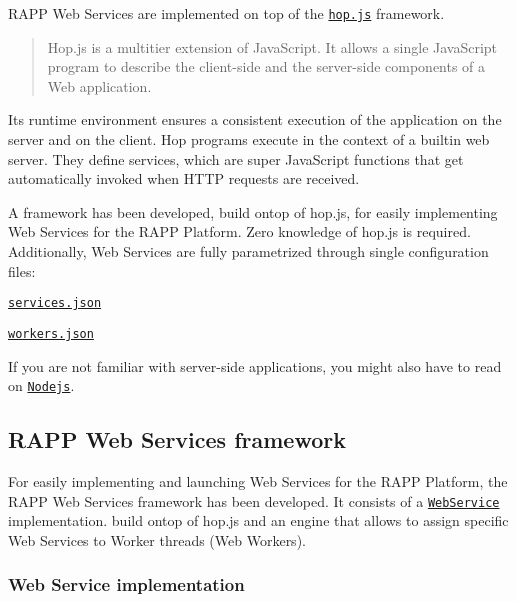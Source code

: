 R\-A\-P\-P Web Services are implemented on top of the \href{http://hop.inria.fr/home/index.html}{\tt hop.\-js} framework. \begin{quotation}
Hop.\-js is a multitier extension of Java\-Script. It allows a single Java\-Script program to describe the client-\/side and the server-\/side components of a Web application.

\end{quotation}
Its runtime environment ensures a consistent execution of the application on the server and on the client. Hop programs execute in the context of a builtin web server. They define services, which are super Java\-Script functions that get automatically invoked when H\-T\-T\-P requests are received.

A framework has been developed, build ontop of hop.\-js, for easily implementing Web Services for the R\-A\-P\-P Platform. Zero knowledge of hop.\-js is required. Additionally, Web Services are fully parametrized through single configuration files\-:


\begin{DoxyItemize}
\item \href{https://github.com/rapp-project/rapp-platform/blob/master/rapp_web_services/config/services/services.json}{\tt services.\-json}
\item \href{https://github.com/rapp-project/rapp-platform/blob/master/rapp_web_services/config/services/workers.json}{\tt workers.\-json}
\end{DoxyItemize}

If you are not familiar with server-\/side applications, you might also have to read on \href{https://nodejs.org/en/}{\tt Nodejs}.

\subsection*{R\-A\-P\-P Web Services framework}

For easily implementing and launching Web Services for the R\-A\-P\-P Platform, the R\-A\-P\-P Web Services framework has been developed. It consists of a \href{https://github.com/rapp-project/rapp-platform/tree/master/rapp_web_services/src/webService}{\tt Web\-Service} implementation. build ontop of hop.\-js and an engine that allows to assign specific Web Services to Worker threads (Web Workers).

\subsubsection*{Web Service implementation}

